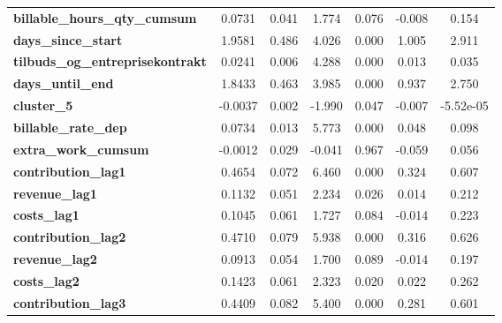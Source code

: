 \begin{center}
\begin{tabular}{lcccccc}
\textbf{billable\_hours\_qty\_cumsum}    &       0.0731  &        0.041     &     1.774  &         0.076        &       -0.008    &        0.154     \\
\textbf{days\_since\_start}              &       1.9581  &        0.486     &     4.026  &         0.000        &        1.005    &        2.911     \\
\textbf{tilbuds\_og\_entreprisekontrakt} &       0.0241  &        0.006     &     4.288  &         0.000        &        0.013    &        0.035     \\
\textbf{days\_until\_end}                &       1.8433  &        0.463     &     3.985  &         0.000        &        0.937    &        2.750     \\
\textbf{cluster\_5}                      &      -0.0037  &        0.002     &    -1.990  &         0.047        &       -0.007    &    -5.52e-05     \\
\textbf{billable\_rate\_dep}             &       0.0734  &        0.013     &     5.773  &         0.000        &        0.048    &        0.098     \\
\textbf{extra\_work\_cumsum}             &      -0.0012  &        0.029     &    -0.041  &         0.967        &       -0.059    &        0.056     \\
\textbf{contribution\_lag1}              &       0.4654  &        0.072     &     6.460  &         0.000        &        0.324    &        0.607     \\
\textbf{revenue\_lag1}                   &       0.1132  &        0.051     &     2.234  &         0.026        &        0.014    &        0.212     \\
\textbf{costs\_lag1}                     &       0.1045  &        0.061     &     1.727  &         0.084        &       -0.014    &        0.223     \\
\textbf{contribution\_lag2}              &       0.4710  &        0.079     &     5.938  &         0.000        &        0.316    &        0.626     \\
\textbf{revenue\_lag2}                   &       0.0913  &        0.054     &     1.700  &         0.089        &       -0.014    &        0.197     \\
\textbf{costs\_lag2}                     &       0.1423  &        0.061     &     2.323  &         0.020        &        0.022    &        0.262     \\
\textbf{contribution\_lag3}              &       0.4409  &        0.082     &     5.400  &         0.000        &        0.281    &        0.601     \\

\end{tabular}
\end{center}
